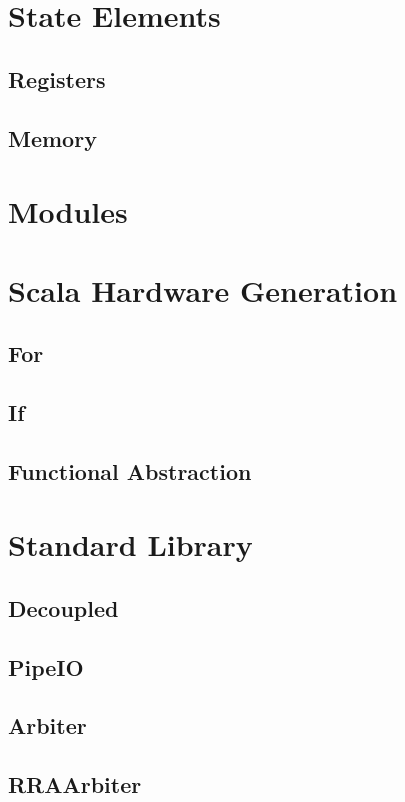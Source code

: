 \documentclass[10pt,landscape]{article}
\begin{document}
\begin{multicols}{3}
\section{State Elements}
\subsection{Registers}

\subsection{Memory}

\section{Modules}

\section{Scala Hardware Generation}
\subsection{For}

\subsection{If}

\subsection{Functional Abstraction}

\section{Standard Library}
\subsection{Decoupled}
\subsection{PipeIO}
\subsection{Arbiter}
\subsection{RRAArbiter}


\end{multicols}
\end{document}
